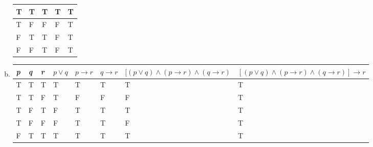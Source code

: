 \begin{itemize}
\begin{enumerate}[a.]
\begin{tabular}{*{5}{|l}|}
                        \hline
                        T          & T          & T         & T                   & T                           \\
                        \hline
                        T          & F          & F         & F                   & T                           \\
                        \hline
                        F          & T          & T         & F                   & T                           \\
                        \hline
                        F          & F          & T         & F                   & T                           \\
                        \hline
                    \end{tabular}
                    \newpage
              \item
                    \begin{tabular}{*{6}{|l} *{2}{|p{3.2cm}}|}
                        \hline
                        \textit{p} & \textit{q} & \textit{r} & $p \lor q$ & $p \to r$ & $q \to r$ & $[(p \lor q) \land (p \to r) \land (q \to r) $ & $[(p \lor q) \land (p \to r) \land (q \to r)] \to r$
                        \\
                        \hline
                        T          & T          & T          & T          & T         & T         & T                                              & T                                                    \\
                        \hline
                        T          & T          & F          & T          & F         & F         & F                                              & T                                                    \\
                        \hline
                        T          & F          & T          & F          & T         & T         & T                                              & T                                                    \\
                        \hline
                        T          & F          & F          & F          & T         & T         & F                                              & T                                                    \\
                        \hline
                        F          & T          & T          & T          & T         & T         & T                                              & T                                                    \\

\end{tabular}
\end{enumerate}
\end{itemize}
